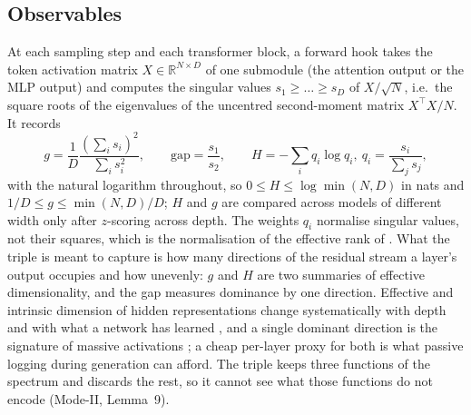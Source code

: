 \documentclass[11pt]{article}
\newcommand{\gap}{\mathrm{gap}}
\begin{document}
\subsection{Observables}
At each sampling step and each transformer block, a forward hook takes the token activation matrix $X\in\mathbb{R}^{N\times D}$ of one submodule (the attention output or the MLP output) and computes the singular values $s_1\ge\dots\ge s_D$ of $X/\sqrt N$, i.e.\ the square roots of the eigenvalues of the uncentred second-moment matrix $X^\top X/N$. It records
\begin{equation}
 g=\frac{1}{D}\frac{(\sum_is_i)^2}{\sum_is_i^2},\qquad \gap=\frac{s_1}{s_2},\qquad H=-\sum_iq_i\log q_i,\ q_i=\frac{s_i}{\sum_js_j},
\end{equation}
with the natural logarithm throughout, so $0\le H\le\log\min(N,D)$ in nats and $1/D\le g\le\min(N,D)/D$; $H$ and $g$ are compared across models of different width only after $z$-scoring across depth. The weights $q_i$ normalise singular values, not their squares, which is the normalisation of the effective rank of \citet{roy2007effective}. What the triple is meant to capture is how many directions of the residual stream a layer's output occupies and how unevenly: $g$ and $H$ are two summaries of effective dimensionality, and the gap measures dominance by one direction. Effective and intrinsic dimension of hidden representations change systematically with depth and with what a network has learned \citep{ansuini2019intrinsic,recanatesi2022scaledependent,valeriani2023geometry}, and a single dominant direction is the signature of massive activations \citep{sun2024massive}; a cheap per-layer proxy for both is what passive logging during generation can afford. The triple keeps three functions of the spectrum and discards the rest, so it cannot see what those functions do not encode (Mode-II, Lemma~9).
\end{document}
